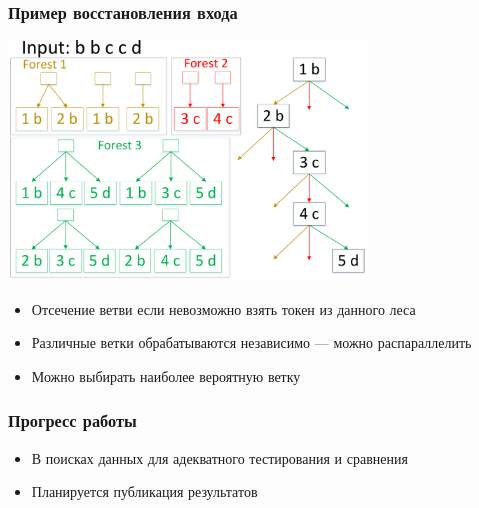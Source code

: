 \documentclass{beamer}
\begin{document}
 \begin{frame}
    \frametitle{Пример восстановления входа}
    \begin{center}
        \includegraphics[width=9.5cm]{pictures/BnBexample.pdf}
    \end{center}
    \begin{itemize}
        \item Отсечение ветви если невозможно взять токен из данного леса
        \item Различные ветки обрабатываются независимо --- можно распараллелить
        \item Можно выбирать наиболее вероятную ветку
    \end{itemize}
\end{frame}

 \begin{frame}
    \frametitle{Прогресс работы}
    \begin{itemize}
        \item В поисках данных для адекватного тестирования и сравнения
        \item Планируется публикация результатов
    \end{itemize}
\end{frame}
\end{document}
